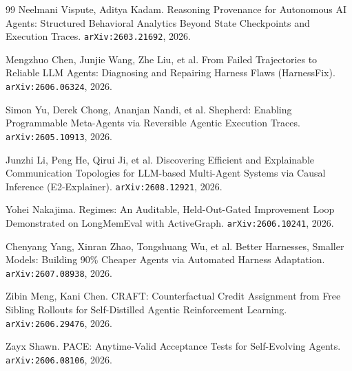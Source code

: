 \begin{thebibliography}{99}
 Neelmani Vispute, Aditya Kadam. Reasoning Provenance for
  Autonomous AI Agents: Structured Behavioral Analytics Beyond State
  Checkpoints and Execution Traces. \texttt{arXiv:2603.21692}, 2026.

 Mengzhuo Chen, Junjie Wang, Zhe Liu, et al. From
  Failed Trajectories to Reliable LLM Agents: Diagnosing and Repairing
  Harness Flaws (HarnessFix). \texttt{arXiv:2606.06324}, 2026.

 Simon Yu, Derek Chong, Ananjan Nandi, et al. Shepherd:
  Enabling Programmable Meta-Agents via Reversible Agentic Execution
  Traces. \texttt{arXiv:2605.10913}, 2026.

 Junzhi Li, Peng He, Qirui Ji, et al. Discovering
  Efficient and Explainable Communication Topologies for LLM-based
  Multi-Agent Systems via Causal Inference (E2-Explainer).
  \texttt{arXiv:2608.12921}, 2026.

 Yohei Nakajima. Regimes: An Auditable, Held-Out-Gated
  Improvement Loop Demonstrated on LongMemEval with ActiveGraph.
  \texttt{arXiv:2606.10241}, 2026.

 Chenyang Yang, Xinran Zhao, Tongshuang Wu, et
  al. Better Harnesses, Smaller Models: Building 90\% Cheaper Agents via
  Automated Harness Adaptation. \texttt{arXiv:2607.08938}, 2026.

 Zibin Meng, Kani Chen. CRAFT: Counterfactual Credit
  Assignment from Free Sibling Rollouts for Self-Distilled Agentic
  Reinforcement Learning. \texttt{arXiv:2606.29476}, 2026.

 Zayx Shawn. PACE: Anytime-Valid Acceptance Tests for
  Self-Evolving Agents. \texttt{arXiv:2606.08106}, 2026.

\end{thebibliography}
